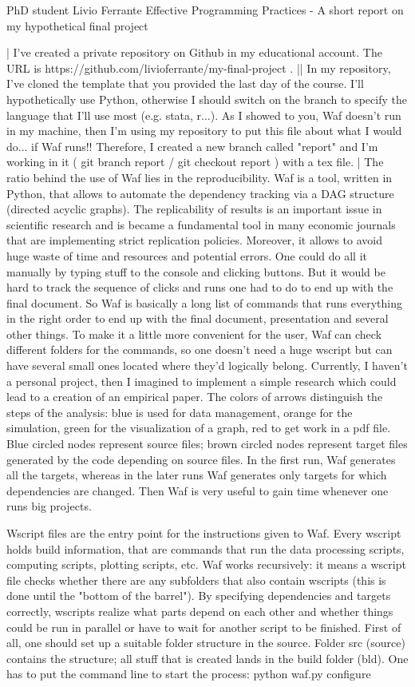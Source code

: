 \documentclass{article}
\begin{document}
PhD student Livio Ferrante
Effective Programming Practices - A short report on my hypothetical final project

|
I've created a private repository on Github in my educational account. The URL is https://github.com/livioferrante/my-final-project .
||
In my repository, I've cloned the template that you provided the last day of the course. I'll hypothetically use Python, otherwise I should switch on the branch to specify the language that I'll use most (e.g. stata, r...).
As I showed to you, Waf doesn't run in my machine, then I'm using my repository to put this file about what I would do... if Waf runs!! Therefore, I created a new branch called "report" and I'm working in it  ( git branch report   /   git checkout report ) with a tex file.
|
The ratio behind the use of Waf lies in the reproducibility. Waf is a tool, written in Python, that allows to automate the dependency tracking via a DAG structure (directed acyclic graphs). The replicability of results is an important issue in scientific research and is became a fundamental tool in many economic journals that are implementing strict replication policies. Moreover, it allows to avoid huge waste of time and resources and potential errors.
One could do all it manually by typing stuff to the console and clicking buttons. But it would be hard to track the sequence of clicks and runs one had to do to end up with the final document. So Waf is basically a long list of commands that runs everything in the right order to end up with the final document, presentation and several other things. To make it a little more convenient for the user, Waf can check different folders for the commands, so one doesn't need a huge wscript but can have several small ones located where they'd logically belong.
Currently, I haven't a personal project, then I imagined to implement a simple research which could lead to a creation of an empirical paper.
The colors of arrows distinguish the steps of the analysis: blue is used for data management, orange for the simulation, green for the visualization of a graph, red to get work in a pdf file.
Blue circled nodes represent source files; brown circled nodes represent target files generated by the code depending on source files. 
In the first run, Waf generates all the targets, whereas in the later runs Waf generates only targets for which dependencies are changed. Then Waf is very useful to gain time whenever one runs big projects. 

Wscript files are the entry point for the instructions given to Waf. Every wscript holds build information, that are commands that run the data processing scripts,  computing scripts, plotting scripts, etc. 
Waf works recursively: it means a wscript file checks whether there are any subfolders that also contain wscripts (this is done until the "bottom of the barrel"). By specifying dependencies and targets correctly, wscripts realize what parts depend on each other and whether things could be run in parallel or have to wait for another script to be finished.
First of all, one should set up a suitable folder structure in the source. Folder src (source) contains the structure; all stuff that is created lands in the build folder (bld). 
One has to put the command line to start the process:  
python waf.py configure  
\end{document}
